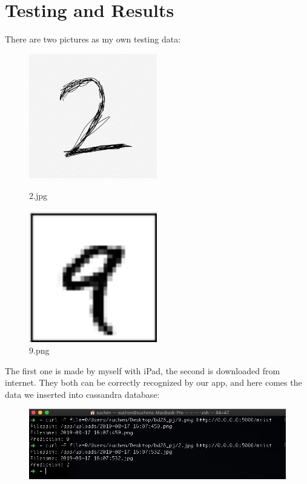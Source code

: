 \documentclass[12pt,hyperref,]{ctexart}
\begin{document}
\section{Testing and Results}\label{testing-and-results}

There are two pictures as my own testing data:

\begin{figure}[H]
\begin{minipage}[t]{0.5\linewidth}
\centering
\includegraphics[width=2.2in]{2.jpg}
\caption{2.jpg}
\label{fig:side:a}
\end{minipage}%
\begin{minipage}[t]{0.5\linewidth}
\centering
\includegraphics[width=2.2in]{9.png}
\caption{9.png}
\label{fig:side:b}
\end{minipage}
\end{figure}

The first one is made by myself with iPad, the second is downloaded from
internet. They both can be correctly recognized by our app, and here
comes the data we inserted into cassandra database:

\begin{figure}[H]
\centering
\includegraphics[width=6in]{curl.png}
\end{figure}
\end{document}
